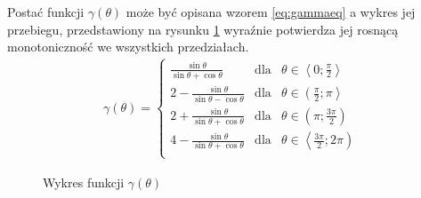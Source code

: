      Postać funkcji $\gamma\left(\theta\right)$ może być opisana wzorem \ref{eq:gammaeq} a wykres jej przebiegu, przedstawiony na rysunku \ref{fig:gamma} wyraźnie potwierdza jej rosnącą monotoniczność we wszystkich przedziałach.
        \begin{align}\label{eq:gammaeq}
        	\gamma\left(
        		\theta
        	\right) = 
        		\left\{
        			\begin{array}{lcl}
        				\frac{
        					\sin\theta
        				}{
							\sin\theta + \cos\theta        			
        				} & 
        					\text{dla} &
        					\theta \in \left\langle
        						0;
        						\frac{
        							\pi
        						}{
									2        						
        						}
        					\right\rangle\\
        				2
        				- \frac{
        					\sin\theta
        				}{
							\sin\theta - \cos\theta        			
        				} & 
        					\text{dla} &
        					\theta \in \left(
        						\frac{
        							\pi
        						}{
									2        						
        						};
        						\pi
        					\right\rangle\\
        				2
        				+ \frac{
        					\sin\theta
        				}{
							\sin\theta + \cos\theta        			
        				} & 
        					\text{dla} &
        					\theta \in \left(
        						\pi;
        						\frac{
        							3\pi
        						}{
									2        						
        						}
        					\right)\\
        				4
        				- \frac{
        					\sin\theta
        				}{
							\sin\theta + \cos\theta        			
        				} & 
        					\text{dla} &
        					\theta \in \left\langle
        						\frac{
        							3\pi
        						}{
									2        						
        						};
        						2\pi
        					\right)\\
        			\end{array}
        		\right.      		
        \end{align}
        \begin{figure}[h!]
        	\begin{center}
    			
    			\caption{Wykres funkcji $\gamma\left(\theta\right)$\mysrc}\label{fig:gamma}
    	\end{center}
    	\end{figure}\vspace{-8 mm}\\
       
